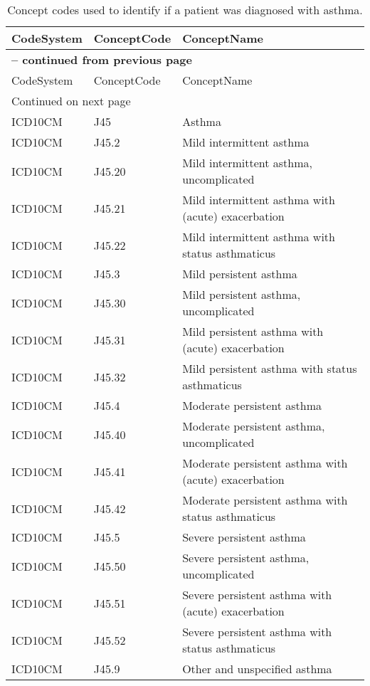 \begin{longtable}{p{}p{}p{}}
\caption{Concept codes used to identify if a patient was diagnosed with asthma.} \\ 
 CodeSystem & ConceptCode & ConceptName \\ 
  \hline 
\endfirsthead 
\multicolumn{3}{p{\textwidth}}{{ \bfseries \tablename \thetable{} -- continued from previous page}} \\ 
\hline CodeSystem & ConceptCode & ConceptName \\ \hline 
\endhead 
\hline \multicolumn{3}{p{\textwidth}}{{Continued on next page}} \\ \hline 
\endfoot 
\hline 
\endlastfoot 
 \hline
ICD10CM & J45 & Asthma \\ 
  ICD10CM & J45.2 & Mild intermittent asthma \\ 
  ICD10CM & J45.20 & Mild intermittent asthma, uncomplicated \\ 
  ICD10CM & J45.21 & Mild intermittent asthma with (acute) exacerbation \\ 
  ICD10CM & J45.22 & Mild intermittent asthma with status asthmaticus \\ 
  ICD10CM & J45.3 & Mild persistent asthma \\ 
  ICD10CM & J45.30 & Mild persistent asthma, uncomplicated \\ 
  ICD10CM & J45.31 & Mild persistent asthma with (acute) exacerbation \\ 
  ICD10CM & J45.32 & Mild persistent asthma with status asthmaticus \\ 
  ICD10CM & J45.4 & Moderate persistent asthma \\ 
  ICD10CM & J45.40 & Moderate persistent asthma, uncomplicated \\ 
  ICD10CM & J45.41 & Moderate persistent asthma with (acute) exacerbation \\ 
  ICD10CM & J45.42 & Moderate persistent asthma with status asthmaticus \\ 
  ICD10CM & J45.5 & Severe persistent asthma \\ 
  ICD10CM & J45.50 & Severe persistent asthma, uncomplicated \\ 
  ICD10CM & J45.51 & Severe persistent asthma with (acute) exacerbation \\ 
  ICD10CM & J45.52 & Severe persistent asthma with status asthmaticus \\ 
  ICD10CM & J45.9 & Other and unspecified asthma \\ 

\end{longtable}
